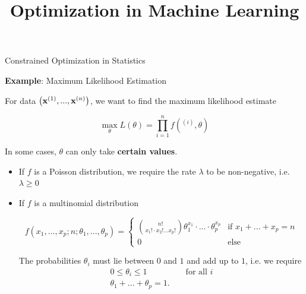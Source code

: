 \documentclass[11pt,compress,t,notes=noshow, xcolor=table]{beamer}
\title{Optimization in Machine Learning}
\date{}
\begin{document}

\sloppy

\begin{vbframe}{Constrained Optimization in Statistics}

\textbf{Example}: Maximum Likelihood Estimation

\lz

For data $\left(\mathbf{x}^{(1)}, ..., \mathbf{x}^{(n)}\right)$, we want to find the maximum likelihood estimate

$$
\max_\theta L(\theta) = \prod_{i = 1}^n f(^{(i)}, \theta)
$$

In some cases, $\theta$ can only take \textbf{certain values}. 

\lz 

\begin{itemize}
\item If $f$ is a Poisson distribution, we require the rate $\lambda$ to be non-negative, i.e. $\lambda \ge 0$

  \item If $f$ is a multinomial distribution

\begin{footnotesize}
  $$
  f(x_1, ..., x_p; n; \theta_1, ..., \theta_p) = \begin{cases} \binom{n!}{x_1! \cdot x_2! ... x_p!} \theta_1^{x_1} \cdot ... \cdot \theta_p^{x_p} & \text{if } x_1 + ... + x_p = n \\ 0 & \text{else}
  \end{cases}
  $$
\end{footnotesize}

  The probabilities $\theta_i$ must lie between $0$ and $1$ and add up to $1$, i.e. we require 
  \begin{eqnarray*}
  	0 \le \theta_i \le 1 && \text{ for all } i \\
  	 \theta_1 + ... + \theta_p = 1. &&
  \end{eqnarray*}

\end{itemize}

\end{vbframe}
\end{document}
